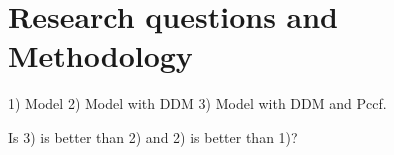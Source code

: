 \chapter{Research questions and Methodology}

1) Model 2) Model with DDM 3) Model with DDM and Pccf.

Is 3) is better than 2) and 2) is better than 1)?
